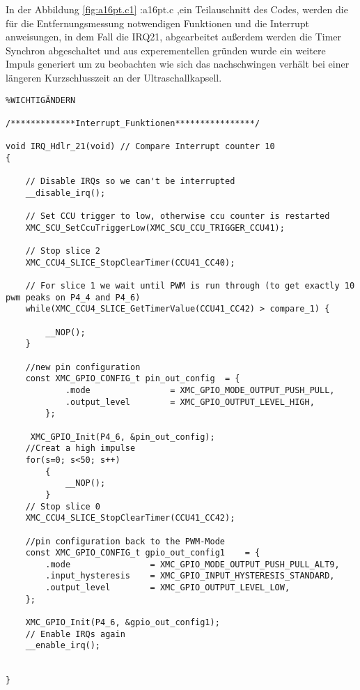 
In der Abbildung \ref{fig:a16pt.c1} :a16pt.c ,ein Teilauschnitt des Codes, werden die für die Entfernungsmessung notwendigen Funktionen und die Interrupt anweisungen, in dem Fall die IRQ21, abgearbeitet außerdem werden die Timer Synchron abgeschaltet und aus experementellen gründen wurde ein weitere Impuls generiert um zu beobachten wie sich das nachschwingen verhält bei einer längeren Kurzschlusszeit an der Ultraschallkapsell.
\\
\begin{minipage}{1\textwidth}
\begin{lstlisting}%WICHTIGÄNDERN

/*************Interrupt_Funktionen****************/

void IRQ_Hdlr_21(void) // Compare Interrupt counter 10
{

	// Disable IRQs so we can't be interrupted
	__disable_irq();

	// Set CCU trigger to low, otherwise ccu counter is restarted
	XMC_SCU_SetCcuTriggerLow(XMC_SCU_CCU_TRIGGER_CCU41);

	// Stop slice 2
	XMC_CCU4_SLICE_StopClearTimer(CCU41_CC40);

	// For slice 1 we wait until PWM is run through (to get exactly 10 pwm peaks on P4_4 and P4_6)
	while(XMC_CCU4_SLICE_GetTimerValue(CCU41_CC42) > compare_1) {

		__NOP();
	}
	
	//new pin configuration
	const XMC_GPIO_CONFIG_t pin_out_config	= {
			.mode                = XMC_GPIO_MODE_OUTPUT_PUSH_PULL,
			.output_level        = XMC_GPIO_OUTPUT_LEVEL_HIGH,
		};

	 XMC_GPIO_Init(P4_6, &pin_out_config);
	//Creat a high impulse
	for(s=0; s<50; s++)
		{
			__NOP();
		}
	// Stop slice 0
	XMC_CCU4_SLICE_StopClearTimer(CCU41_CC42);
	
	//pin configuration back to the PWM-Mode
	const XMC_GPIO_CONFIG_t gpio_out_config1	= {
		.mode                = XMC_GPIO_MODE_OUTPUT_PUSH_PULL_ALT9,
		.input_hysteresis    = XMC_GPIO_INPUT_HYSTERESIS_STANDARD,
		.output_level        = XMC_GPIO_OUTPUT_LEVEL_LOW,
	};

	XMC_GPIO_Init(P4_6, &gpio_out_config1);
	// Enable IRQs again
	__enable_irq();


}
\end{lstlisting}
\label{fig:a16pt.c1}
\end{minipage}




